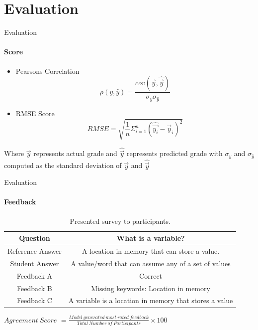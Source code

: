 \documentclass[aspectratio=169]{beamer}
\begin{document}
\section{Evaluation}
\begin{frame}{Evaluation}
	\framesubtitle{Score}
	\begin{itemize}
		\item Pearsons Correlation
		\begin{equation}
		\label{equation:pearson correlation}
		\rho(y,\hat{y}) = \frac{cov(\vec{y},\hat{\vec{y}})}{\sigma_y \sigma_{\hat{y}}}
		\end{equation}
		\item RMSE Score
		\begin{equation}
		\label{equation:Root mean square error}
		RMSE = \sqrt{\frac{1}{n}\Sigma_{i=1}^n(\hat{\vec{y_i}} - \vec{y}_i)^2}
		\end{equation}
	\end{itemize}
Where $\vec{y}$ represents actual grade and $\hat{\vec{y}}$ represents predicted grade with $\sigma_y$ and $\sigma_{\hat{y}}$ computed as the standard deviation of $\vec{y}$ and $\hat{\vec{y}}$
\end{frame}
\begin{frame}{Evaluation}
\framesubtitle{Feedback}
\begin{table}
	\begin{center}
		\begin{tabular}{ |c|c| }
			\hline
			\cellcolor{Gray}Question & \cellcolor{Gray}What is a variable?  
			\\ \hline 
			Reference Answer & A location in memory that can store a value.
			\\ \hline
			\cellcolor{Gray}Student Answer & \cellcolor{Gray}A value/word that can assume any of a set of values
			\\ \hline
			Feedback A & Correct
			\\ \hline
			\cellcolor{Gray}Feedback B & \cellcolor{Gray}Missing keywords: Location in memory
			\\ \hline
			Feedback C & A variable is a location in memory that stores a value
			\\ \hline
		\end{tabular}
		\caption{Presented survey to participants.}
		\label{table:language models}
	\end{center}
\end{table}
\centering
$Agreement\ Score$ $= \frac{Model\ generated\ most\ rated\ feedback}{Total\ Number\ of\ Participants}\times 100$
\end{frame}
\end{document}
